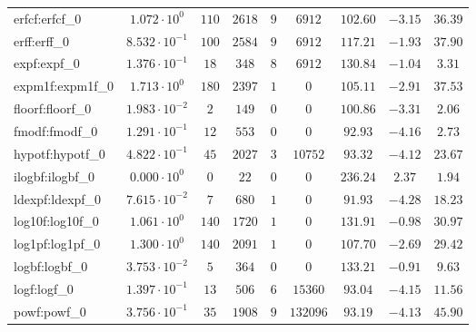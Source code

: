 \begin{tabular}{|l|c|c|c|c|c|c|c|c|}
erfcf:erfcf\_0               & $ 1.072 \cdot 10^{0}  $ & $ 110    $ & $ 2618  $ & $ 9   $ & $ 6912   $ & $ 102.60      $ & $ -3.15   $ & $ 36.39   $ \\
erff:erff\_0                 & $ 8.532 \cdot 10^{-1} $ & $ 100    $ & $ 2584  $ & $ 9   $ & $ 6912   $ & $ 117.21      $ & $ -1.93   $ & $ 37.90   $ \\
expf:expf\_0                 & $ 1.376 \cdot 10^{-1} $ & $ 18     $ & $ 348   $ & $ 8   $ & $ 6912   $ & $ 130.84      $ & $ -1.04   $ & $ 3.31    $ \\
expm1f:expm1f\_0             & $ 1.713 \cdot 10^{0}  $ & $ 180    $ & $ 2397  $ & $ 1   $ & $ 0      $ & $ 105.11      $ & $ -2.91   $ & $ 37.53   $ \\
floorf:floorf\_0             & $ 1.983 \cdot 10^{-2} $ & $ 2      $ & $ 149   $ & $ 0   $ & $ 0      $ & $ 100.86      $ & $ -3.31   $ & $ 2.06    $ \\
fmodf:fmodf\_0               & $ 1.291 \cdot 10^{-1} $ & $ 12     $ & $ 553   $ & $ 0   $ & $ 0      $ & $ 92.93       $ & $ -4.16   $ & $ 2.73    $ \\
hypotf:hypotf\_0             & $ 4.822 \cdot 10^{-1} $ & $ 45     $ & $ 2027  $ & $ 3   $ & $ 10752  $ & $ 93.32       $ & $ -4.12   $ & $ 23.67   $ \\
ilogbf:ilogbf\_0             & $ 0.000 \cdot 10^{0}  $ & $ 0      $ & $ 22    $ & $ 0   $ & $ 0      $ & $ 236.24      $ & $ 2.37    $ & $ 1.94    $ \\
ldexpf:ldexpf\_0             & $ 7.615 \cdot 10^{-2} $ & $ 7      $ & $ 680   $ & $ 1   $ & $ 0      $ & $ 91.93       $ & $ -4.28   $ & $ 18.23   $ \\
log10f:log10f\_0             & $ 1.061 \cdot 10^{0}  $ & $ 140    $ & $ 1720  $ & $ 1   $ & $ 0      $ & $ 131.91      $ & $ -0.98   $ & $ 30.97   $ \\
log1pf:log1pf\_0             & $ 1.300 \cdot 10^{0}  $ & $ 140    $ & $ 2091  $ & $ 1   $ & $ 0      $ & $ 107.70      $ & $ -2.69   $ & $ 29.42   $ \\
logbf:logbf\_0               & $ 3.753 \cdot 10^{-2} $ & $ 5      $ & $ 364   $ & $ 0   $ & $ 0      $ & $ 133.21      $ & $ -0.91   $ & $ 9.63    $ \\
logf:logf\_0                 & $ 1.397 \cdot 10^{-1} $ & $ 13     $ & $ 506   $ & $ 6   $ & $ 15360  $ & $ 93.04       $ & $ -4.15   $ & $ 11.56   $ \\
powf:powf\_0                 & $ 3.756 \cdot 10^{-1} $ & $ 35     $ & $ 1908  $ & $ 9   $ & $ 132096 $ & $ 93.19       $ & $ -4.13   $ & $ 45.90   $ \\

\end{tabular}
